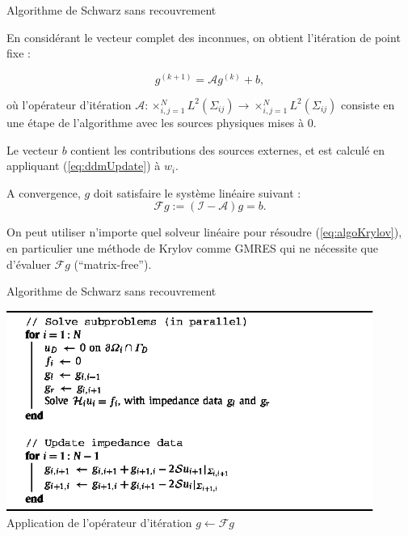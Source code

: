 \documentclass[
mode=present,    %
paper=a4paper,   %
orient=landscape,
display=slides,   %
size=10pt,
style=romain   %
]{powerdot}
\begin{document}
\begin{slide}[toc=]{Algorithme de Schwarz sans recouvrement}

En considérant le vecteur complet des inconnues, on obtient l'itération de
point fixe :

\[
g^{(k+1)} = \mathcal{A}g^{(k)}+b,
\]

où l'opérateur d'itération  $\mathcal{A}:
\times_{i,j=1}^NL^2(\Sigma_{ij})\rightarrow\times_{i,j=1}^NL^2(\Sigma_{ij})$
consiste en une étape de l'algorithme avec les sources physiques mises à
$0$. 

\bigskip

Le vecteur $b$ contient les contributions des sources externes, et est
calculé en appliquant (\ref{eq:ddmUpdate}) à $w_{i}$. 

\bigskip

A convergence, $g$
doit satisfaire le système linéaire suivant :
\begin{equation}
\mathcal{F}g := (\mathcal{I}-\mathcal{A})g = b.
\label{eq:algoKrylov}
\end{equation}

\bigskip

On peut utiliser n'importe quel solveur linéaire pour résoudre
(\ref{eq:algoKrylov}), en particulier une méthode de Krylov comme GMRES qui
ne nécessite que d'évaluer $\mathcal{F}g$ (``matrix-free'').

\end{slide}

\begin{slide}[toc=]{Algorithme de Schwarz sans recouvrement}

\bigskip
\begin{center}
 \includegraphics[width=0.9\textwidth]{algo1.eps}\\[1em]
 Application de l'opérateur d'itération $g\leftarrow\mathcal{F}g$
\end{center}


\end{slide}
\end{document}
